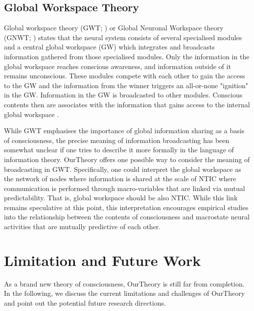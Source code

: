 \documentclass[utf8]{article}
\begin{document}
				
        
		\subsection{Global Workspace Theory}
		Global workspace theory (GWT; \cite{baars1988cognitive, baars1997theatre, baars2002conscious}) or Global Neuronal Workspace theory (GNWT; \cite{dehaene1998neuronal, dehaene2001towards, dehaene2011experimental}) states that the neural system consists of several specialised modules and a central global workspace (GW) which integrates and broadcasts information gathered from those specialised modules. Only the information in the global workspace reaches conscious awareness, and information outside of it remains unconscious. These modules compete with each other to gain the access to the GW and the information from the winner triggers an all-or-none "ignition" in the GW. Information in the GW is broadcasted to other modules. Conscious contents then are associates with the information that gains access to the internal global workspace \cite{Dehaene2017}.
		
        While GWT emphasises the importance of global information sharing as a basis of consciousness, the precise meaning of information broadcasting has been somewhat unclear if one tries to describe it more formally in the language of information theory. \ac{OurTheory} offers one possible way to consider the meaning of broadcasting in GWT. Specifically, one could interpret the global workspace as the network of nodes where information is shared at the scale of NTIC where communication is performed through macro-variables that are linked via mutual predictability. That is, global workspace should be also NTIC. While this link remains speculative at this point, this interpretation encourages empirical studies into the relationship between the contents of consciousness and macrostate neural activities that are mutually predictive of each other. 
		

    \section{Limitation and Future Work}\label{sec:Limitation and Future work}  
        As a brand new theory of consciousness, \ac{OurTheory} is still far from completion. In the following, we discuss the current limitations and challenges of \ac{OurTheory} and point out the potential future research directions.
    
\end{document}
